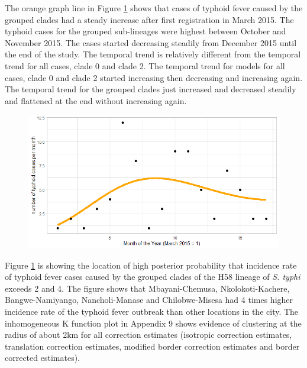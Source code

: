 The orange graph line in Figure \ref{fig:temporal-distribution-grouped-clades} shows that cases of typhoid fever caused by the grouped clades had a steady increase after first registration in March 2015. The typhoid cases for the grouped sub-lineages were highest between October and November 2015. The cases started decreasing steadily from December 2015 until the end of the study. The temporal trend is relatively different from the temporal trend for all cases, clade 0 and clade 2. The temporal trend for models for all cases, clade 0 and clade 2 started increasing then decreasing and increasing again. The temporal trend for the grouped clades just increased and decreased steadily and flattened at the end without increasing again.

\begin{figure}[H]
    \begin{center}
        \includegraphics[scale=0.7]{Long term trend of temporal model - Major 13456.png}
    \end{center}
     \label{fig:temporal-distribution-grouped-clades}
\end{figure}

Figure \ref{fig:temporal-distribution-grouped-clades} is showing the location of high posterior probability that incidence rate of typhoid fever cases caused by the grouped clades of the H58 lineage of \textit{S. typhi} exceeds 2 and 4. The figure shows that Mbayani-Chemusa, Nkolokoti-Kachere, Bangwe-Namiyango, Nancholi-Manase and Chilobwe-Misesa had 4 times higher incidence rate of the typhoid fever outbreak than other locations in the city. The inhomogeneous K function plot in Appendix 9 shows evidence of clustering at the radius of about 2km for all correction estimates (isotropic correction estimates, translation correction estimates, modified border correction estimates and border corrected estimates).

